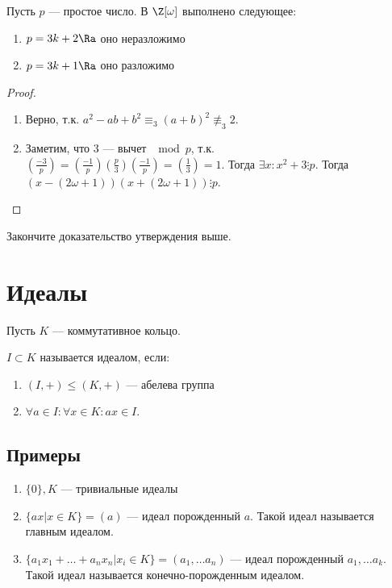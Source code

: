 \begin{proposition}
    Пусть \(p\) --- простое число. В \(\Z[\omega]\) выполнено следующее:
    \begin{enumerate}
        \item \(p = 3k + 2 \Ra\) оно неразложимо
        \item \(p = 3k + 1 \Ra\) оно разложимо
    \end{enumerate}
\end{proposition}
\begin{proof}
    \begin{enumerate}
        \item Верно, т.к. \(a^2 - ab + b^2 \equiv_3 (a + b)^2 \not\equiv_3 2\).
        \item Заметим, что \(3\) --- вычет \(\mod p\), т.к. \(\left( \frac{-3}{p} \right) = \left( \frac{-1}{p} \right)\left( \frac{p}{3} \right)\left( \frac{-1}{p} \right) = \left( \frac{1}{3} \right) = 1\). Тогда \(\exists x: x^2 + 3 \vdots p\). Тогда \((x - (2\omega + 1))(x + (2\omega + 1)) \vdots p\).
    \end{enumerate}
\end{proof}

\begin{exercise}
    Закончите доказательство утверждения выше.
\end{exercise}

\section{Идеалы}
Пусть \(K\) --- коммутативное кольцо.
\begin{definition}
    \(I \subset K\) называется идеалом, если:
    \begin{enumerate}
        \item \((I, +) \le (K, +)\) --- абелева группа
        \item \(\forall a \in I: \forall x \in K: ax \in I\).
    \end{enumerate}
\end{definition}

\subsection{Примеры}
\begin{enumerate}
    \item \(\{0\}, K\) --- тривиальные идеалы
    \item \(\{ax | x \in K\} = (a)\) --- идеал порожденный \(a\). Такой идеал называется главным идеалом.
    \item \(\{a_1x_1 + \dots + a_nx_n | x_i \in K\} = (a_1, \dots a_n)\) --- идеал порожденный \(a_1, \dots a_k\). Такой идеал называется конечно-порожденным идеалом.
\end{enumerate}

